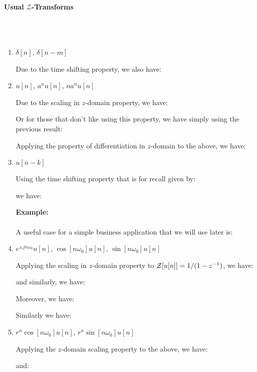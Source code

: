 	\paragraph{Usual $\mathcal{Z}$-Transforms}\mbox{}\\\\
	\begin{enumerate}

		\item $\delta[n]$, $\delta[n-m]$
		
		Due to the time shifting property, we also have:
		
		
		\item $u[n]$, $a^n u[n]$, $n a^n u[n]$
		
		
		Due to the scaling in $z$-domain property, we have:
		
		Or for those that don't like using this property, we have simply using the previous result:
		
		Applying the property of differentiation in $z$-domain to the above, we have:
		
		
		\item $u[n-k]$

		Using the time shifting property that is for recall given by:
		
		we have:
		
		\begin{tcolorbox}[colframe=black,colback=white,sharp corners]
		\textbf{{\Large {}}Example:}\\\\
		A useful case for a simple business application that we will use later is:
		
		\end{tcolorbox}
		
		\item $e^{\pm jn\omega_0}u[n]$, $\cos[n\omega_0]u[n]$, $\sin[n\omega_0]u[n]$
		
		Applying the scaling in $z$-domain property to ${\cal Z}[u[n]]=1/(1-z^{-1})$, we have:
		
		and similarly, we have:
		
		Moreover, we have:
		
		Similarly we have:
		
		
		\item $r^n \cos[n\omega_0]u[n]$, $r^n \sin[n\omega_0]u[n]$
		
		Applying the $z$-domain scaling property to the above, we have:
		
		and:
		
	
	\end{enumerate}
	
